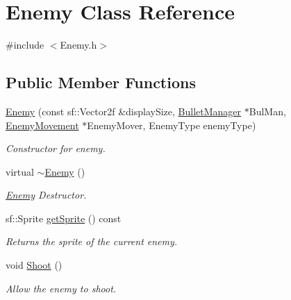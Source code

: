 \hypertarget{class_enemy}{}\section{Enemy Class Reference}
\label{class_enemy}


{\ttfamily \#include $<$Enemy.\+h$>$}

\subsection*{Public Member Functions}
\begin{DoxyCompactItemize}
\item 
\hyperlink{class_enemy_aad76aec6e71a26cff30fd4bb1d5323d2}{Enemy} (const sf\+::\+Vector2f \&display\+Size, \hyperlink{class_bullet_manager}{Bullet\+Manager} $\ast$Bul\+Man, \hyperlink{class_enemy_movement}{Enemy\+Movement} $\ast$Enemy\+Mover, Enemy\+Type enemy\+Type)
\begin{DoxyCompactList}\small\item\em Constructor for enemy. \end{DoxyCompactList}\item 
\mbox{\label{class_enemy_ac0eec4755e28c02688065f9657150ac3}} 
virtual \hyperlink{class_enemy_ac0eec4755e28c02688065f9657150ac3}{$\sim$\+Enemy} ()
\begin{DoxyCompactList}\small\item\em \hyperlink{class_enemy}{Enemy} Destructor. \end{DoxyCompactList}\item 
\mbox{\label{class_enemy_a8f769acc8f473846d11eaabf504a1089}} 
sf\+::\+Sprite \hyperlink{class_enemy_a8f769acc8f473846d11eaabf504a1089}{get\+Sprite} () const
\begin{DoxyCompactList}\small\item\em Returns the sprite of the current enemy. \end{DoxyCompactList}\item 
\mbox{\label{class_enemy_ab526cfaf13910e15ca1e5e84ef230dd1}} 
void \hyperlink{class_enemy_ab526cfaf13910e15ca1e5e84ef230dd1}{Shoot} ()
\begin{DoxyCompactList}\small\item\em Allow the enemy to shoot. \end{DoxyCompactList}\item 

\end{DoxyCompactItemize}
